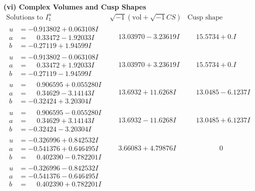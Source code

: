 \documentclass[1p]{elsarticle_modified}
\theoremstyle{definition}
\newcommand{\I}{\sqrt{-1}}
\begin{document}
\newpage\flushleft \textbf{(vi) Complex Volumes and Cusp Shapes}
$$\begin{array}{c|c|c}  
\text{Solutions to }I^u_{1}& \I (\text{vol} + \sqrt{-1}CS) & \text{Cusp shape}\\
 \hline 
\begin{aligned}
u &= -0.913802 + 0.063108 I \\
a &= \phantom{-}0.33472 - 1.92033 I \\
b &= -0.27119 + 1.94599 I\end{aligned}
 & \phantom{-}13.03970 - 3.23619 I & \phantom{-}15.5734 + 0. I\phantom{ +0.000000I} \\ \hline\begin{aligned}
u &= -0.913802 - 0.063108 I \\
a &= \phantom{-}0.33472 + 1.92033 I \\
b &= -0.27119 - 1.94599 I\end{aligned}
 & \phantom{-}13.03970 + 3.23619 I & \phantom{-}15.5734 + 0. I\phantom{ +0.000000I} \\ \hline\begin{aligned}
u &= \phantom{-}0.906595 + 0.055280 I \\
a &= \phantom{-}0.34629 - 3.14143 I \\
b &= -0.32424 + 3.20304 I\end{aligned}
 & \phantom{-}13.6932 + 11.6268 I & \phantom{-}13.0485 - 6.1237 I \\ \hline\begin{aligned}
u &= \phantom{-}0.906595 - 0.055280 I \\
a &= \phantom{-}0.34629 + 3.14143 I \\
b &= -0.32424 - 3.20304 I\end{aligned}
 & \phantom{-}13.6932 - 11.6268 I & \phantom{-}13.0485 + 6.1237 I \\ \hline\begin{aligned}
u &= -0.326996 + 0.842532 I \\
a &= -0.541376 + 0.646495 I \\
b &= \phantom{-}0.402390 - 0.782201 I\end{aligned}
 & \phantom{-}3.66083 + 4.79876 I & \phantom{-0.000000 } 0 \\ \hline\begin{aligned}
u &= -0.326996 - 0.842532 I \\
a &= -0.541376 - 0.646495 I \\
b &= \phantom{-}0.402390 + 0.782201 I\end{aligned}

\end{array}$$
\end{document}
